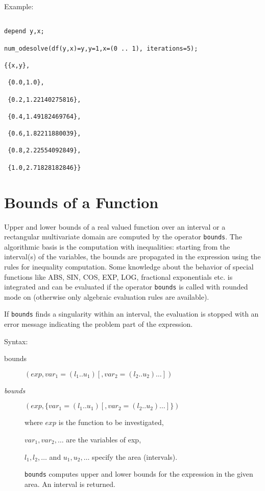 Example:
\begin{verbatim}

depend y,x;

num_odesolve(df(y,x)=y,y=1,x=(0 .. 1), iterations=5);

{{x,y},

 {0.0,1.0},

 {0.2,1.22140275816},

 {0.4,1.49182469764},

 {0.6,1.82211880039},

 {0.8,2.22554092849},

 {1.0,2.71828182846}}

\end{verbatim}


\section{Bounds of a Function}
\hypertarget{operator:BOUNDS}{}

Upper and lower bounds of a real valued function over an
interval or a rectangular multivariate domain are computed
by the operator \texttt{bounds}. The algorithmic basis is the computation
with inequalities: starting from the interval(s) of the
variables, the bounds are propagated in the expression
using the rules for inequality computation. Some knowledge
about the behavior of special functions like ABS, SIN, COS, EXP, LOG,
fractional exponentials etc. is integrated and can be evaluated
if the operator \texttt{bounds} is called with rounded mode on
(otherwise only algebraic evaluation rules are available).

If \texttt{bounds} finds a singularity within an interval, the evaluation
is stopped with an error message indicating the problem part
of the expression.

Syntax:
\begin{description}
\item[bounds]$(exp,var_1=(l_1 .. u_1) [,var_2=(l_2 .. u_2) \ldots])$

\item[\textit{bounds}]$(exp,\{var_1=(l_1 .. u_1) [,var_2=(l_2 .. u_2)\ldots]\})$

where $exp$ is the function to be investigated,

$var_1, var_2 , \ldots$ are the variables of exp,

$l_1, l_2 , \ldots$  and  $u_1, u_2 , \ldots$ specify the area (intervals).

\texttt{bounds} computes upper and lower bounds for the expression in the
given area. An interval is returned.

\end{description}

